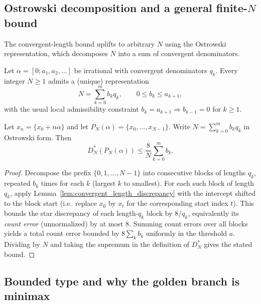 \subsection{Ostrowski decomposition and a general finite-\texorpdfstring{$N$}{N} bound}
\label{app:ostrowski_discrepancy}
The convergent-length bound uplifts to arbitrary $N$ using the Ostrowski
representation, which decomposes $N$ into a sum of convergent denominators.

\begin{definition}
\label{def:ostrowski_representation_statement}
Let $\alpha=[0;a_1,a_2,\ldots]$ be irrational with convergent denominators
$q_k$.
Every integer $N\ge 1$ admits a (unique) representation
\[
N=\sum_{k=0}^{m} b_k q_k,
\qquad
0\le b_k\le a_{k+1},
\]
with the usual local admissibility constraint
$b_k=a_{k+1}\Rightarrow b_{k-1}=0$ for $k\ge 1$.
\end{definition}

\begin{proposition}
\label{prop:digit_sum_discrepancy}
Let $x_n=\{x_0+n\alpha\}$ and let $P_N(\alpha)=\{x_0,\ldots,x_{N-1}\}$.
Write $N=\sum_{k=0}^{m} b_k q_k$ in Ostrowski form.
Then
\[
D_N^\ast(P_N(\alpha))
\le
\frac{8}{N}\sum_{k=0}^{m} b_k.
\]
\end{proposition}
\begin{proof}
Decompose the prefix $\{0,1,\ldots,N-1\}$ into consecutive blocks of lengths
$q_k$, repeated $b_k$ times for each $k$ (largest $k$ to smallest).
For each such block of length $q_k$, apply
Lemma~\ref{lem:convergent_length_discrepancy} with the intercept shifted to the
block start (i.e.\ replace $x_0$ by $x_t$ for the corresponding start index
$t$).
This bounds the star discrepancy of each length-$q_k$ block by $8/q_k$,
equivalently its \emph{count error} (unnormalized) by at most $8$.
Summing count errors over all blocks yields a total count error bounded by
$8\sum_k b_k$ uniformly in the threshold $a$.
Dividing by $N$ and taking the supremum in the definition of $D_N^\ast$
gives the stated bound.
\end{proof}

\subsection{Bounded type and why the golden branch is minimax}
\label{app:bounded_type}

